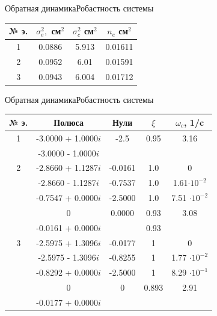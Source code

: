\begin{frame}{Обратная динамика}{Робастность системы}

\begin{table}[H]
    \begin{tabular}{|c|c|c|c|}
        \hline 
        № э.& $\sigma^2_e,$ см$^2$ & $\sigma^2_c$ см$^2$ & $n_e$ см$^2$ \\ \hline 
        1& 0.0886 & 5.913 & 0.01611\\ \hline
        2& 0.0952 & 6.01  & 0.01591 \\ \hline
        3& 0.0943 & 6.004 & 0.01712\\ \hline

    \end{tabular}
\end{table}
\end{frame}
 
\begin{frame}{Обратная динамика}{Робастность системы}
\begin{table}[H]
    \begin{tabular}{|c|c|c|c|c|}
        \hline 
        № э.&Полюса & Нули & $\xi$ & $\omega_c$, 1/c \\ \hline 
        1& -3.0000 + 1.0000$i$ & -2.5 & 0.95 & 3.16\\ 
        & -3.0000 - 1.0000$i$ &   &  &  \\ \hline
        2& -2.8660 + 1.1287$i$ & -0.0161  & 1.0 &  0\\ 
        & -2.8660 - 1.1287$i$ &  -0.7537 &1.0 & 1.61$\cdot 10^{-2}$\\ 
        & -0.7547 + 0.0000$i$ &  -2.5000 & 1.0 & 7.51 $\cdot 10^{-2}$\\ 
        & 0 & 0.0000 & 0.93& 3.08 \\ 
        & -0.0161 + 0.0000$i$ &  & 0.93 &  \\ \hline 
        3& -2.5975 + 1.3096$i$ & -0.0177 & 1 & 0\\ 
        & -2.5975 - 1.3096$i$ & -0.8255 & 1& 1.77 $\cdot 10^{-2}$ \\ 
        & -0.8292 + 0.0000$i$ & -2.5000 & 1 & 8.29 $\cdot 10^{-1}$\\ 
        & 0 & 0 & 0.893 & 2.91 \\ 
        & -0.0177 + 0.0000$i$ &  &  &  \\ \hline 
    \end{tabular}
\end{table}

\end{frame}